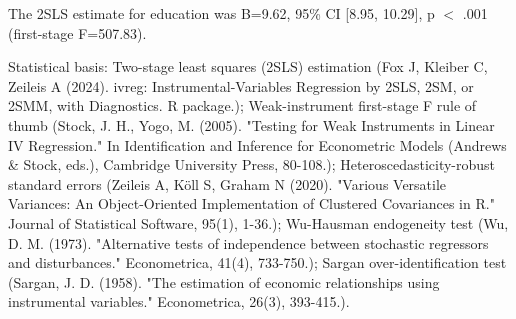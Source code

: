 \documentclass{article}
\begin{document}
The 2SLS estimate for education was B=9.62, 95\% CI [8.95, 10.29], p $<$ .001 (first-stage F=507.83).

Statistical basis: Two-stage least squares (2SLS) estimation (Fox J, Kleiber C, Zeileis A (2024). ivreg: Instrumental-Variables Regression by 2SLS, 2SM, or 2SMM, with Diagnostics. R package.); Weak-instrument first-stage F rule of thumb (Stock, J. H., Yogo, M. (2005). "Testing for Weak Instruments in Linear IV Regression." In Identification and Inference for Econometric Models (Andrews \& Stock, eds.), Cambridge University Press, 80-108.); Heteroscedasticity-robust standard errors (Zeileis A, Köll S, Graham N (2020). "Various Versatile Variances: An Object-Oriented Implementation of Clustered Covariances in R." Journal of Statistical Software, 95(1), 1-36.); Wu-Hausman endogeneity test (Wu, D. M. (1973). "Alternative tests of independence between stochastic regressors and disturbances." Econometrica, 41(4), 733-750.); Sargan over-identification test (Sargan, J. D. (1958). "The estimation of economic relationships using instrumental variables." Econometrica, 26(3), 393-415.).
\end{document}
